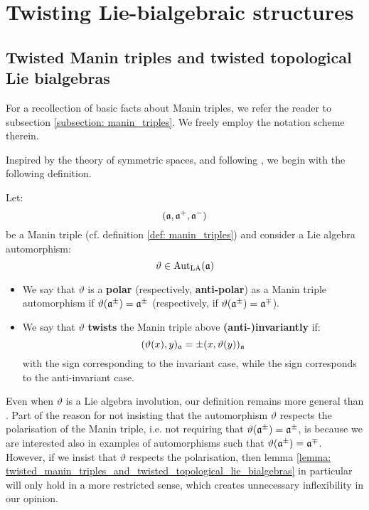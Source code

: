 \section{Twisting Lie-bialgebraic structures}
    \subsection{Twisted Manin triples and twisted topological Lie bialgebras} \label{subsection: twisted_manin_triples}
        For a recollection of basic facts about Manin triples, we refer the reader to subsection \ref{subsection: manin_triples}. We freely employ the notation scheme therein.

        Inspired by the theory of symmetric spaces, and following \cite{belliard_crampe_coideal_subalgebras_from_twisted_manin_triples}, we begin with the following definition.
        \begin{definition} \label{def: twisted_manin_triples}
            Let:
                $$(\mathfrak{a}, \mathfrak{a}^+, \mathfrak{a}^-)$$
            be a Manin triple (cf. definition \ref{def: manin_triples}) and consider a Lie algebra automorphism:
                $$\vartheta \in \operatorname{Aut}_{\mathrm{LA}}(\mathfrak{a})$$
            \begin{itemize}
                \item We say that $\vartheta$ is a \textbf{polar} (respectively, \textbf{anti-polar}) as a Manin triple automorphism if $\vartheta(\mathfrak{a}^{\pm}) = \mathfrak{a}^{\pm}$ (respectively, if $\vartheta(\mathfrak{a}^{\pm}) = \mathfrak{a}^{\mp}$).
                \item We say that $\vartheta$ \textbf{twists} the Manin triple above \textbf{(anti-)invariantly} if:
                    $$(\vartheta(x), y)_{\mathfrak{a}} = \pm (x, \vartheta(y))_{\mathfrak{a}}$$
                with the \say{$+$} sign corresponding to the invariant case, while the \say{$-$} sign corresponds to the anti-invariant case.
            \end{itemize}
        \end{definition}
        \begin{remark}
            Even when $\vartheta$ is a Lie algebra involution, our definition remains more general than \cite[Definition 2.1]{belliard_crampe_coideal_subalgebras_from_twisted_manin_triples}. Part of the reason for not insisting that the automorphism $\vartheta$ respects the polarisation of the Manin triple, i.e. not requiring that $\vartheta(\mathfrak{a}^{\pm}) = \mathfrak{a}^{\pm}$, is because we are interested also in examples of automorphisms such that $\vartheta(\mathfrak{a}^{\pm}) = \mathfrak{a}^{\mp}$. However, if we insist that $\vartheta$ respects the polarisation, then lemma \ref{lemma: twisted_manin_triples_and_twisted_topological_lie_bialgebras} in particular will only hold in a more restricted sense, which creates unnecessary inflexibility in our opinion.
        \end{remark}

